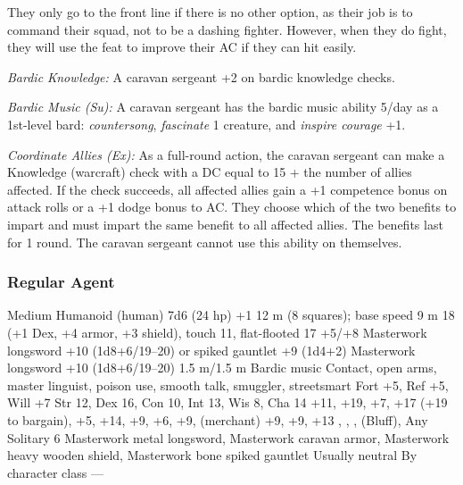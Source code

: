 They only go to the front line if there is no other option, as their job is to command their squad, not to be a dashing fighter. However, when they do fight, they will use the  feat to improve their AC if they can hit easily.

\textit{Bardic Knowledge:} A caravan sergeant +2 on bardic knowledge checks.

\textit{Bardic Music (Su):} A caravan sergeant has the bardic music ability 5/day as a 1st-level bard: \emph{countersong}, \emph{fascinate} 1 creature, and \emph{inspire courage} +1.

\textit{Coordinate Allies (Ex):} As a full-round action, the caravan sergeant can make a Knowledge (warcraft) check with a DC equal to 15 + the number of allies affected. If the check succeeds, all affected allies gain a +1 competence bonus on attack rolls or a +1 dodge bonus to AC. They choose which of the two benefits to impart and must impart the same benefit to all affected allies. The benefits last for 1 round. The caravan sergeant cannot use this ability on themselves.

\subsubsection{Regular Agent}
\begin{MonsterStats}
{Medium Humanoid (human)}
{7d6 (24 hp)}
{+1}
{12 m (8 squares); base speed 9 m}
{18 (+1 Dex, +4 armor, +3 shield), touch 11, flat-flooted 17}
{+5/+8}
{Masterwork longsword +10 (1d8+6/19--20) or spiked gauntlet +9 (1d4+2)}
{Masterwork longsword +10 (1d8+6/19--20)}
{1.5 m/1.5 m}
{Bardic music}
{Contact, open arms, master linguist, poison use, smooth talk, smuggler, streetsmart}
{Fort +5, Ref +5, Will +7}
{Str 12, Dex 16, Con 10, Int 13, Wis 8, Cha 14}
{
	 +11,
	 +19,
	 +7,
	 +17 (+19 to bargain),
	 +5,
	 +14,
	 +9,
	 +6,
	 +9,
	 (merchant) +9,
	 +9,
	 +13
}
{
	,
	,
	,
	 (Bluff),
}
{Any}
{Solitary}
{6}
{
	Masterwork metal longsword,
	Masterwork caravan armor,
	Masterwork heavy wooden shield,
	Masterwork bone spiked gauntlet
}
{Usually neutral}
{By character class}
{---}
\end{MonsterStats}



